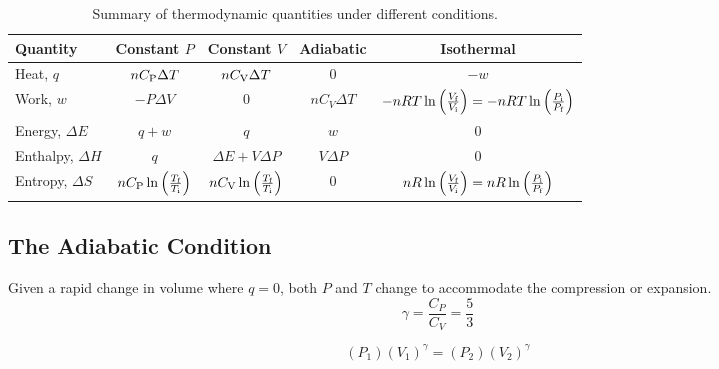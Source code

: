 \documentclass[10pt]{article}
\begin{document}
\bigskip\begin{table}[H]
    \centering
    \caption{Summary of thermodynamic quantities under different conditions.}
        \begin{tabular}{lcccc}
            \toprule
            Quantity  & Constant $P$ & Constant $V$ & Adiabatic & Isothermal\\
            \midrule
            Heat, $q$    & $nC_\textnormal{P}\Delta T$ & $nC_\textnormal{V}\Delta T$ & 0 & $-w$ \\
            Work, $w$    & $-P\Delta V$ & 0 & $nC_V\Delta T$ & $-nRT\ln \left(\frac{V_\textnormal{f}}{V_\textnormal{i}}\right) = -nRT\ln \left(\frac{P_\textnormal{i}}{P_\textnormal{f}}\right)$ \\
            Energy, $\Delta E$ & $q+w$ & $q$ & $w$ & 0 \\
            Enthalpy, $\Delta H$ & $q$ & $\Delta E + V\Delta P$ & $V\Delta P$ & 0  \\
            Entropy, $\Delta S$ & $nC_\textnormal{P}\ln \left(\frac{T_\textnormal{f}}{T_\textnormal{i}}\right)$ &  $nC_\textnormal{V}\ln \left(\frac{T_\textnormal{f}}{T_\textnormal{i}}\right)$ & 0 & $nR\ln \left(\frac{V_\textnormal{f}}{V_\textnormal{i}}\right) = nR\ln \left(\frac{P_\textnormal{i}}{P_\textnormal{f}}\right)$ \\          
            \bottomrule
        \end{tabular}
    \label{cond}
\end{table}




\subsection{The Adiabatic Condition}

Given a rapid change in volume where $q=0$, both $P$ and $T$ change to accommodate the compression or expansion.
\begin{equation*}
\gamma = \frac{C_P}{C_V} = \frac{5}{3}
\end{equation*}

\begin{equation*}
(P_1)(V_1)^\gamma = (P_2)(V_2)^\gamma
\end{equation*}
\end{document}
